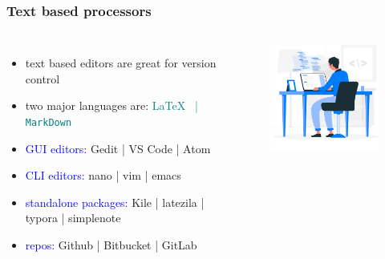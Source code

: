 \documentclass[newPxFont,sthlmFooter]{beamer}
\newcommand{\fs}{\footnotesize}
\begin{document}
\begin{frame}\frametitle{Text based processors}
  \begin{columns}[T,onlytextwidth]
      \vspace{0.2cm}
  \begin{itemize}
    \fs
	\item text based editors are great for version control
	\item two major languages are: \textcolor{teal}{\LaTeX~ | \texttt{MarkDown}}
	\item \textcolor{blue}{GUI editors:} Gedit | VS Code | Atom
	\item \textcolor{blue}{CLI editors:} nano | vim | emacs
	\item \textcolor{blue}{standalone packages:} Kile | latezila | typora | simplenote
	\item \textcolor{blue}{repos:} Github | Bitbucket | GitLab
  \end{itemize}
        \vspace{0.5cm}
  \begin{figure}
    \centering
    \includegraphics[width=2in]{figs/code} 
  \end{figure}
  \end{columns}
\end{frame}
\end{document}
